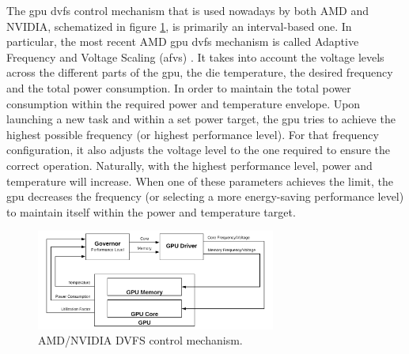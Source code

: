 The \acrshort{gpu} \acrshort{dvfs} control mechanism that is used nowadays by both AMD and NVIDIA, schematized in figure \ref{fig:DVFSmechanism}, is primarily an interval-based one. In particular, the most recent AMD \acrshort{gpu} \acrshort{dvfs} mechanism is called Adaptive Frequency and Voltage Scaling (\acrshort{afvs}) \cite{amd_polaris_2017}. It takes into account the voltage levels across the different parts of the \acrshort{gpu}, the die temperature, the desired frequency and the total power consumption. In order to maintain the total power consumption within the required power and temperature envelope. Upon launching a new task and within a set power target, the \acrshort{gpu} tries to achieve the highest possible frequency (or highest performance level). For that frequency configuration, it also adjusts the voltage level to the one required to ensure the correct operation. Naturally, with the highest performance level, power and temperature will increase. When one of these parameters achieves the limit, the \acrshort{gpu} decreases the frequency (or selecting a more energy-saving performance level) to maintain itself within the power and temperature target. 

\begin{figure}[htb]
  \centering
  \includegraphics[width=0.7\textwidth]{Figures/Background/DVFS.png}
  \caption{AMD/NVIDIA DVFS control mechanism.}
  \label{fig:DVFSmechanism}
\end{figure}


